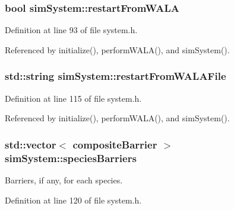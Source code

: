 \hypertarget{classsim_system_a2b168c89742f4d64270583e7e54b2929}{
\subsubsection[{restart\-From\-W\-A\-L\-A}]{\setlength{\rightskip}{0pt plus 5cm}bool sim\-System\-::restart\-From\-W\-A\-L\-A}}\label{classsim_system_a2b168c89742f4d64270583e7e54b2929}


Definition at line 93 of file system.\-h.



Referenced by initialize(), perform\-W\-A\-L\-A(), and sim\-System().

\hypertarget{classsim_system_afbf0b172dc35572e71ec6d27a018e2fc}{
\subsubsection[{restart\-From\-W\-A\-L\-A\-File}]{\setlength{\rightskip}{0pt plus 5cm}std\-::string sim\-System\-::restart\-From\-W\-A\-L\-A\-File}}\label{classsim_system_afbf0b172dc35572e71ec6d27a018e2fc}


Definition at line 115 of file system.\-h.



Referenced by initialize(), perform\-W\-A\-L\-A(), and sim\-System().

\hypertarget{classsim_system_a5ae652ff4519f39c3862abae32a9581b}{
\subsubsection[{species\-Barriers}]{\setlength{\rightskip}{0pt plus 5cm}std\-::vector$<$ {\bf composite\-Barrier} $>$ sim\-System\-::species\-Barriers}}\label{classsim_system_a5ae652ff4519f39c3862abae32a9581b}


Barriers, if any, for each species. 



Definition at line 120 of file system.\-h.



